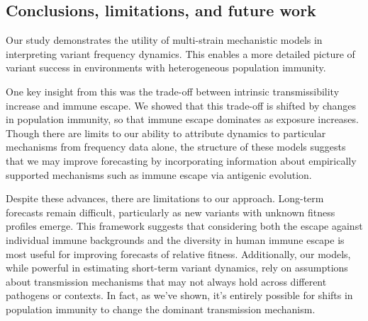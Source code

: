 \documentclass[11pt,oneside,letterpaper]{article}
\def\tbc#1{\textcolor{purple}{[#1]}}
\begin{document}
%
%
\subsection*{Conclusions, limitations, and future work}

Our study demonstrates the utility of multi-strain mechanistic models in interpreting variant frequency dynamics.
This enables a more detailed picture of variant success in environments with heterogeneous population immunity.

One key insight from this was the trade-off between intrinsic transmissibility increase and immune escape.
We showed that this trade-off is shifted by changes in population immunity, so that immune escape dominates as exposure increases.
Though there are limits to our ability to attribute dynamics to particular mechanisms from frequency data alone, the structure of these models suggests that we may improve forecasting by incorporating information about empirically supported mechanisms such as immune escape via antigenic evolution.

Despite these advances, there are limitations to our approach.
Long-term forecasts remain difficult, particularly as new variants with unknown fitness profiles emerge.
This framework suggests that considering both the escape against individual immune backgrounds and the diversity in human immune escape is most useful for improving forecasts of relative fitness.
Additionally, our models, while powerful in estimating short-term variant dynamics, rely on assumptions about transmission mechanisms that may not always hold across different pathogens or contexts.
In fact, as we've shown, it's entirely possible for shifts in population immunity to change the dominant transmission mechanism.
\end{document}
